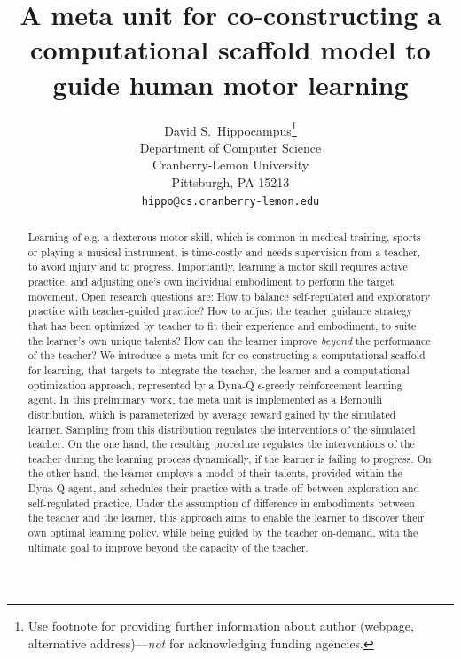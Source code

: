 \documentclass{article}
\title{A meta unit for co-constructing a computational scaffold model to guide human motor learning}
\author{%
  David S.~Hippocampus\thanks{Use footnote for providing further information
    about author (webpage, alternative address)---\emph{not} for acknowledging
    funding agencies.} \\
  Department of Computer Science\\
  Cranberry-Lemon University\\
  Pittsburgh, PA 15213 \\
  \texttt{hippo@cs.cranberry-lemon.edu} \\
}
\begin{document}
\maketitle


\begin{abstract}
 Learning of e.g. a dexterous motor skill,  which is common in medical
training, sports or playing a musical instrument, is time-costly and
needs supervision from a teacher,  to avoid injury and to progress. Importantly, learning a
motor skill requires active practice, and adjusting one's own individual
embodiment to perform the target movement.  Open research questions are: How to balance self-regulated and exploratory
practice with teacher-guided practice?  How to adjust the teacher guidance strategy that
has been optimized by teacher to fit their experience and embodiment, to suite the learner's own
unique talents?  How can the learner improve \textit{beyond} the
performance of the teacher?  
We introduce a  meta unit for co-constructing a computational scaffold for learning, that targets to integrate the teacher, the learner and a computational optimization approach, represented by a Dyna-Q $\epsilon$-greedy  reinforcement learning agent. 
In this preliminary work,  the meta unit is implemented as a Bernoulli distribution, which is parameterized by average reward gained by the simulated learner. Sampling from this distribution regulates the interventions of the  simulated teacher. 
On the one hand, the resulting procedure regulates the interventions of the teacher during the learning process dynamically, if the learner is failing to progress.   
On the other hand, the learner employs a  model of their talents, provided within the Dyna-Q agent,  and schedules their practice with a trade-off between exploration and self-regulated practice. Under the assumption of difference in embodiments between the teacher and the learner,  this approach aims to enable the learner to discover their own optimal learning policy, while being guided by the teacher on-demand, with the ultimate goal to improve  beyond the capacity of the teacher.  

\end{abstract}
\end{document}
